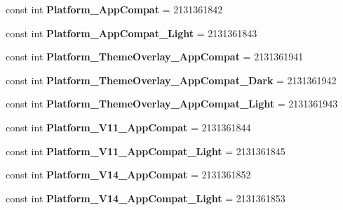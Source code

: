\begin{DoxyCompactItemize}
\mbox{\label{classXaria_1_1Resource_1_1Style_a4bba44093ebd3ef312cac1d452b1d400}} 
const int {\bfseries Platform\+\_\+\+App\+Compat} = 2131361842
\item 
\mbox{\label{classXaria_1_1Resource_1_1Style_afecbf6e48bded3026b3381f461e9f8bf}} 
const int {\bfseries Platform\+\_\+\+App\+Compat\+\_\+\+Light} = 2131361843
\item 
\mbox{\label{classXaria_1_1Resource_1_1Style_a431685efb85a19105cf54893f9b62ae1}} 
const int {\bfseries Platform\+\_\+\+Theme\+Overlay\+\_\+\+App\+Compat} = 2131361941
\item 
\mbox{\label{classXaria_1_1Resource_1_1Style_a164428644bd8525c4d0943cc3f0635e9}} 
const int {\bfseries Platform\+\_\+\+Theme\+Overlay\+\_\+\+App\+Compat\+\_\+\+Dark} = 2131361942
\item 
\mbox{\label{classXaria_1_1Resource_1_1Style_afb4eaaaa71d6d5d852528bafbfb871b6}} 
const int {\bfseries Platform\+\_\+\+Theme\+Overlay\+\_\+\+App\+Compat\+\_\+\+Light} = 2131361943
\item 
\mbox{\label{classXaria_1_1Resource_1_1Style_a700f7c267ef91c436e99c5b2809aa551}} 
const int {\bfseries Platform\+\_\+\+V11\+\_\+\+App\+Compat} = 2131361844
\item 
\mbox{\label{classXaria_1_1Resource_1_1Style_a68748baeb1f8bea1d3b425f180316854}} 
const int {\bfseries Platform\+\_\+\+V11\+\_\+\+App\+Compat\+\_\+\+Light} = 2131361845
\item 
\mbox{\label{classXaria_1_1Resource_1_1Style_a8f108ef48d9a0954dd3b0b7a42fb6bac}} 
const int {\bfseries Platform\+\_\+\+V14\+\_\+\+App\+Compat} = 2131361852
\item 
\mbox{\label{classXaria_1_1Resource_1_1Style_a2820ce6581c75564da628fb531431a61}} 
const int {\bfseries Platform\+\_\+\+V14\+\_\+\+App\+Compat\+\_\+\+Light} = 2131361853
\item 

\end{DoxyCompactItemize}
